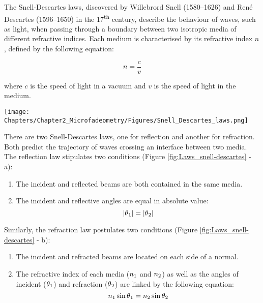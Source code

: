 The Snell-Descartes laws, discovered by Willebrord Snell (1580–1626) and René Descartes (1596–1650) in the 17\textsuperscript{th} century, describe the behaviour of waves, such as light, when passing through a boundary between two isotropic media of different refractive indices. Each medium is characterised by its refractive index $n$, defined by the following equation:

\begin{equation}
    n = \frac{c}{v}
\end{equation}

where $c$ is the speed of light in a vacuum and $v$ is the speed of light in the medium.\\

\begin{figure*}[!h]
\centering
\texttt{[image: Chapters/Chapter2\_Microfadeometry/Figures/Snell\_Descartes\_laws.png]}
\caption[\hspace{0.3cm}Snell-Descartes reflection and refraction laws.]{Snell-Descartes reflection (a) and refraction (b) laws.}
\label{fig:Laws_snell-descartes}
\end{figure*}

There are two Snell-Descartes laws, one for reflection and another for refraction. Both predict the trajectory of waves crossing an interface between two media. The reflection law stipulates two conditions (Figure \ref{fig:Laws_snell-descartes} - a):
\begin{enumerate}
    \item The incident and reflected beams are both contained in the same media.
    \item The incident and reflective angles are equal in absolute value:
    \begin{equation}
        \lvert\theta\textsubscript1\rvert = \lvert\theta\textsubscript2\rvert
    \label{eq:reflection}
    \end{equation}
\end{enumerate}


Similarly, the refraction law postulates two conditions (Figure \ref{fig:Laws_snell-descartes} - b):
\begin{enumerate}
    \item The incident and refracted beams are located on each side of a normal.
    \item The refractive index of each media ($n\textsubscript{1}$ and $n\textsubscript{2}$) as well as the angles of incident ($\theta\textsubscript{1}$) and refraction ($\theta\textsubscript{2}$) are linked by the following equation: 
    \begin{equation}
        n\textsubscript{1}\sin{\theta\textsubscript{1}} = n\textsubscript{2}\sin{\theta\textsubscript{2}}
    \label{eq:refraction}
    \end{equation}   
\end{enumerate}

